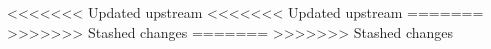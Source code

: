 \def\xxactivite{\ifprof TP -- Corrigé  \else  TP \fi}
\def\xxauteur{\textsl{É. Durif -- X. Pessoles -- J.-P. Berne}}



\def\xxYCartouche{-2.25cm}
\def\xxYongletGarde{.5cm}
\def\xxYOnget{.9cm}





\def\xxfigures{
}%




\setlength{\columnseprule}{.1pt}

\pagestyle{fancy}
\thispagestyle{plain}


<<<<<<< Updated upstream
<<<<<<< Updated upstream
\vspace{4.5cm}
\vspace{3.5cm}
\vspace{3.5cm}
=======
\vspace{3.5cm}
>>>>>>> Stashed changes
=======
\vspace{3.5cm}
>>>>>>> Stashed changes

\def\columnseprulecolor{\color{ocre}}
\setlength{\columnseprule}{0.4pt} 


\setcounter{exo}{0}
\vspace{3cm}




